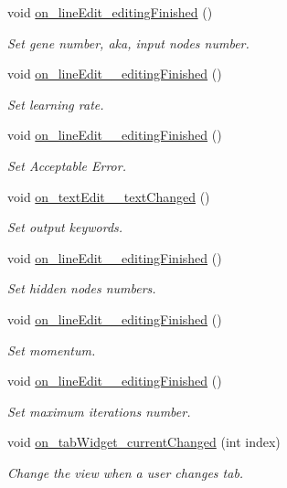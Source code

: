 \begin{DoxyCompactItemize}
void \hyperlink{a00002_ab5da77a34a83e9794edda0d77d79bec0}{on\-\_\-line\-Edit\-\_\-editing\-Finished} ()
\begin{DoxyCompactList}\small\item\em Set gene number, aka, input nodes number. \end{DoxyCompactList}\item 
void \hyperlink{a00002_a6aff5c3694d19ebd2bd81010c239cf62}{on\-\_\-line\-Edit\-\_\-\_\-editing\-Finished} ()
\begin{DoxyCompactList}\small\item\em Set learning rate. \end{DoxyCompactList}\item 
void \hyperlink{a00002_a6bcefb22fdfb8fbd3146eab38a0023d7}{on\-\_\-line\-Edit\-\_\-\_\-editing\-Finished} ()
\begin{DoxyCompactList}\small\item\em Set Acceptable Error. \end{DoxyCompactList}\item 
void \hyperlink{a00002_a39f58394bb8e9691a7b32774114a910a}{on\-\_\-text\-Edit\-\_\-\_\-text\-Changed} ()
\begin{DoxyCompactList}\small\item\em Set output keywords. \end{DoxyCompactList}\item 
void \hyperlink{a00002_a18234ca4d797ca5566d710c77594158b}{on\-\_\-line\-Edit\-\_\-\_\-editing\-Finished} ()
\begin{DoxyCompactList}\small\item\em Set hidden nodes numbers. \end{DoxyCompactList}\item 
void \hyperlink{a00002_ad2416c2c2d9ce13441a9cd81c47c02e4}{on\-\_\-line\-Edit\-\_\-\_\-editing\-Finished} ()
\begin{DoxyCompactList}\small\item\em Set momentum. \end{DoxyCompactList}\item 
void \hyperlink{a00002_a4f47f7bac07a3ad5f0238a09a526d7c8}{on\-\_\-line\-Edit\-\_\-\_\-editing\-Finished} ()
\begin{DoxyCompactList}\small\item\em Set maximum iterations number. \end{DoxyCompactList}\item 
void \hyperlink{a00002_a8cb47192d9b34bdc1ba3d47e0b0f2d4f}{on\-\_\-tab\-Widget\-\_\-current\-Changed} (int index)
\begin{DoxyCompactList}\small\item\em Change the view when a user changes tab. \end{DoxyCompactList}\end{DoxyCompactItemize}
